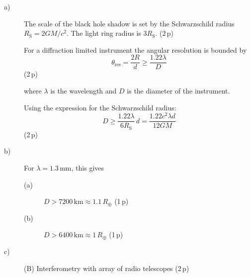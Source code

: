 \begin{description}
\item[a)] The scale of the black hole shadow is set by the Schwarzschild
  radius $R_{\mathrm{S}} = 2GM/c^2$. The light ring radius is
  $3R_{\mathrm{S}}$. \hfill(2\,p)

  For a diffraction limited instrument the angular resolution is bounded by
  \begin{equation*}
    \theta_{\mathrm{res}} = \frac{2R}{d} \ge \frac{1.22\lambda}{D}
    \tag{3.1}
  \end{equation*}
  \hfill(2\,p)

  where $\lambda$ is the wavelength and $D$ is the diameter of the
  instrument.

  Using the expression for the Schwarzschild radius:
  \begin{equation*}
    D \ge \frac{1.22\lambda}{6R_{\mathrm{S}}}\,d
      = \frac{1.22c^2\lambda d}{12GM}
    \tag{3.2}
  \end{equation*}
  \hfill(2\,p)
\item[b)] For $\lambda = 1.3$\,mm, this gives
  \begin{description}
  \item[(a)] $D > 7200\,\mathrm{km} \approx 1.1\,R_\oplus$ \hfill(1\,p)
  \item[(b)] $D > 6400\,\mathrm{km} \approx 1\,R_\oplus$ \hfill(1\,p)
  \end{description}
\item[c)] (B) Interferometry with array of radio telescopes \hfill(2\,p)
\end{description}
